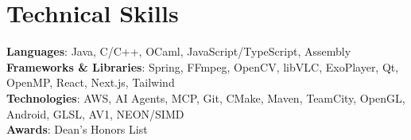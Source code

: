 \documentclass[letterpaper,11pt]{article}
\begin{document}
    \section{Technical Skills}
    \begin{itemize}[leftmargin=0.15in, label={}]
    \small{\item{
        \textbf{Languages}{: Java, C/C++, OCaml, JavaScript/TypeScript, Assembly} \\
        \textbf{Frameworks \& Libraries}{: Spring, FFmpeg, OpenCV, libVLC, ExoPlayer, Qt, OpenMP, React, Next.js, Tailwind} \\
        \textbf{Technologies}{: AWS, AI Agents, MCP, Git, CMake, Maven, TeamCity, OpenGL, Android, GLSL, AV1, NEON/SIMD} \\
        \textbf{Awards}{: Dean's Honors List}
    }}
    \end{itemize}


\end{document}
